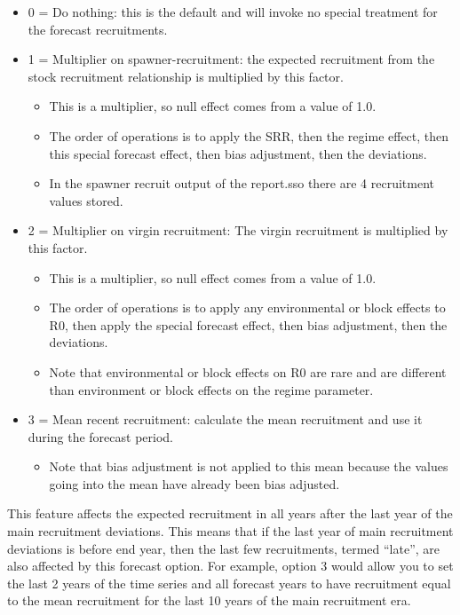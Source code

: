 \begin{itemize}
	\item 0 = Do nothing: this is the default and will invoke no special treatment for the forecast recruitments.
	\item 1 = Multiplier on spawner-recruitment: the expected recruitment from the stock recruitment relationship is multiplied by this factor.
	\begin{itemize}
		\item This is a multiplier, so null effect comes from a value of 1.0.
		\item The order of operations is to apply the SRR, then the regime effect, then this special forecast effect, then bias adjustment, then the deviations.
		\item In the spawner recruit output of the report.sso there are 4 recruitment values stored.
	\end{itemize}
	\item 2 = Multiplier on virgin recruitment: The virgin recruitment is multiplied by this factor.
	\begin{itemize}
		\item This is a multiplier, so null effect comes from a value of 1.0.
		\item The order of operations is to apply any environmental or block effects to R0, then apply the special forecast effect, then bias adjustment, then the deviations.
		\item Note that environmental or block effects on R0 are rare and are different than environment or block effects on the regime parameter.
	\end{itemize}
	\item 3 = Mean recent recruitment: calculate the mean recruitment and use it during the forecast period.
	\begin{itemize}
		\item Note that bias adjustment is not applied to this mean because the values going into the mean have already been bias adjusted.
	\end{itemize}
\end{itemize}

This feature affects the expected recruitment in all years after the last year of the main recruitment deviations. This means that if the last year of main recruitment deviations is before end year, then the last few recruitments, termed ``late'', are also affected by this forecast option. For example, option 3 would allow you to set the last 2 years of the time series and all forecast years to have recruitment equal to the mean recruitment for the last 10 years of the main recruitment era.

\pagebreak
